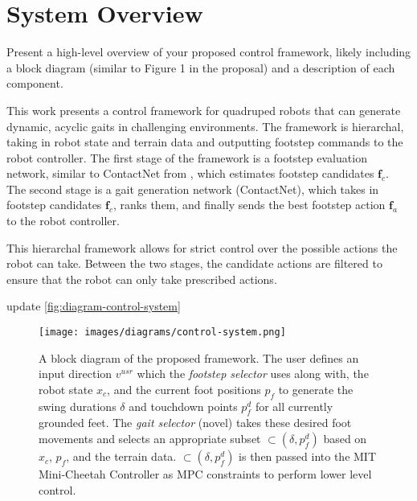 \section{System Overview}

\begin{outline}
  Present a high-level overview of your proposed control framework,
  likely including a block diagram (similar to Figure 1 in the
  proposal) and a description of each component.
\end{outline}

This work presents a control framework for quadruped robots that
can generate dynamic, acyclic gaits in challenging environments. The
framework is hierarchal, taking in robot state and terrain data and
outputting footstep commands to the robot controller. The first stage of
the framework is a footstep evaluation network, similar to ContactNet
from \cite{bratta_contactnet_2024}, which estimates footstep candidates
$\mathbf f_c$.
The second stage is a gait generation
network (ContactNet), which takes in footstep candidates $\mathbf f_c$,
ranks them, and finally sends the best footstep action $\mathbf f_a$ to the
robot controller.

This hierarchal framework allows for strict control over the possible
actions the robot can take. Between the two stages, the candidate
actions are filtered to ensure that the robot can only take prescribed
actions.

\begin{todo}
  update \autoref{fig:diagram-control-system}
\end{todo}

\begin{figure}[H]
  \centering
  \texttt{[image: images/diagrams/control-system.png]}
  \caption{A block diagram of the proposed framework. The user
    defines an input direction $v^{usr}$ which the \textit{footstep
    selector} \cite{bratta_contactnet_2024} uses along with, the robot
    state $x_c$, and the current foot positions $p_f$ to generate the
    swing durations $\delta$ and touchdown points $p_f^d$ for all
    currently grounded feet. The \textit{gait selector} (novel) takes
    these desired foot movements and selects an appropriate subset
    $\subset(\delta,p_f^d)$ based on $x_c$, $p_f$, and the terrain
    data. $\subset(\delta,p_f^d)$ is then passed into the MIT
  Mini-Cheetah Controller as MPC constraints to perform lower level control.}
  \label{fig:diagram-control-system}
\end{figure}
